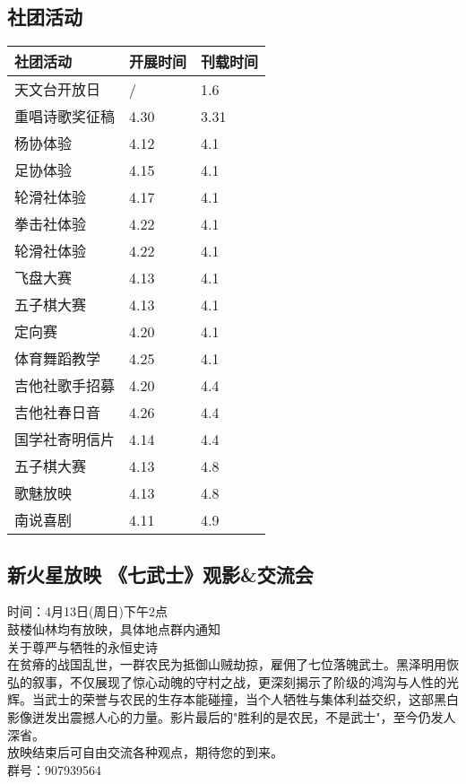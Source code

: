 \documentclass[letterpaper, 12pt]{article}
\begin{document}
\begin{multicols}{2}
\section{社团活动}
\begin{tabular}{|>{\centering\arraybackslash}m{}|m{}|m{}|}
    \hline
    社团活动 & 开展时间 & 刊载时间\\
    \hline\hline
    天文台开放日 & / & 1.6\\
    重唱诗歌奖征稿 & 4.30 & 3.31\\
    杨协体验 & 4.12 & 4.1\\
    足协体验 & 4.15 & 4.1\\
    轮滑社体验 & 4.17 & 4.1\\
    拳击社体验 & 4.22 & 4.1\\
    轮滑社体验 & 4.22 & 4.1\\
    飞盘大赛 & 4.13 & 4.1\\
    五子棋大赛 & 4.13 & 4.1\\
    定向赛 & 4.20 & 4.1\\
    体育舞蹈教学 & 4.25 & 4.1\\
    吉他社歌手招募 & 4.20 & 4.4\\
    吉他社春日音 & 4.26 & 4.4\\
    国学社寄明信片 & 4.14 & 4.4\\
    五子棋大赛 & 4.13 & 4.8\\
    歌魅放映 & 4.13 & 4.8\\
    南说喜剧 & 4.11 & 4.9\\
    \hline
\end{tabular}
\subsection{新火星放映 《七武士》观影\&交流会}
时间：4月13日(周日)下午2点
\\鼓楼仙林均有放映，具体地点群内通知
\\关于尊严与牺牲的永恒史诗
\\在贫瘠的战国乱世，一群农民为抵御山贼劫掠，雇佣了七位落魄武士。黑泽明用恢弘的叙事，不仅展现了惊心动魄的守村之战，更深刻揭示了阶级的鸿沟与人性的光辉。当武士的荣誉与农民的生存本能碰撞，当个人牺牲与集体利益交织，这部黑白影像迸发出震撼人心的力量。影片最后的"胜利的是农民，不是武士"，至今仍发人深省。
\\放映结束后可自由交流各种观点，期待您的到来。
\\群号：907939564


\end{multicols}
\end{document}
